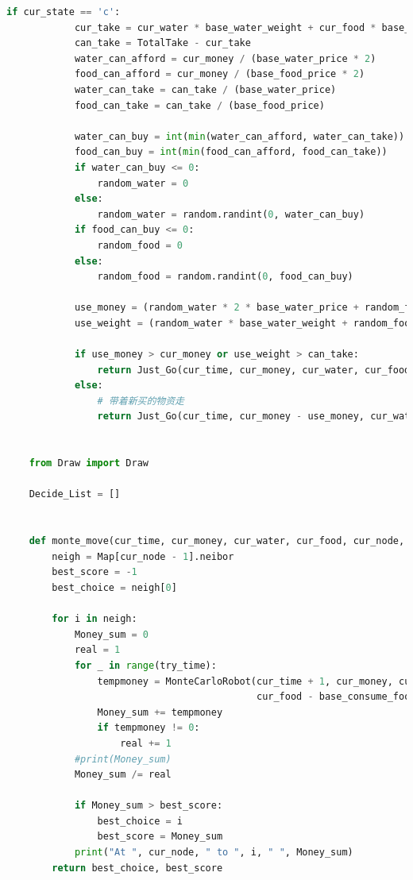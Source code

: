 \documentclass[withoutpreface,bwprint]{cumcmthesis} %
\begin{document}
\begin{appendices}
\begin{lstlisting}[language=python]
        if cur_state == 'c':
            cur_take = cur_water * base_water_weight + cur_food * base_food_weight
            can_take = TotalTake - cur_take
            water_can_afford = cur_money / (base_water_price * 2)
            food_can_afford = cur_money / (base_food_price * 2)
            water_can_take = can_take / (base_water_price)
            food_can_take = can_take / (base_food_price)
    
            water_can_buy = int(min(water_can_afford, water_can_take))
            food_can_buy = int(min(food_can_afford, food_can_take))
            if water_can_buy <= 0:
                random_water = 0
            else:
                random_water = random.randint(0, water_can_buy)
            if food_can_buy <= 0:
                random_food = 0
            else:
                random_food = random.randint(0, food_can_buy)
    
            use_money = (random_water * 2 * base_water_price + random_food * 2 * base_food_price)
            use_weight = (random_water * base_water_weight + random_food * base_food_weight)
    
            if use_money > cur_money or use_weight > can_take:
                return Just_Go(cur_time, cur_money, cur_water, cur_food, cur_node,meet)
            else:
                # 带着新买的物资走
                return Just_Go(cur_time, cur_money - use_money, cur_water + random_water, cur_food + random_food, cur_node,meet)
    
    
    from Draw import Draw
    
    Decide_List = []
    
    
    def monte_move(cur_time, cur_money, cur_water, cur_food, cur_node, try_time):
        neigh = Map[cur_node - 1].neibor
        best_score = -1
        best_choice = neigh[0]
    
        for i in neigh:
            Money_sum = 0
            real = 1
            for _ in range(try_time):
                tempmoney = MonteCarloRobot(cur_time + 1, cur_money, cur_water - base_consume_water[0] * 2,
                                            cur_food - base_consume_food[0] * 2, i)
                Money_sum += tempmoney
                if tempmoney != 0:
                    real += 1
            #print(Money_sum)
            Money_sum /= real
    
            if Money_sum > best_score:
                best_choice = i
                best_score = Money_sum
            print("At ", cur_node, " to ", i, " ", Money_sum)
        return best_choice, best_score
    

\end{lstlisting}
\end{appendices}
\end{document}
